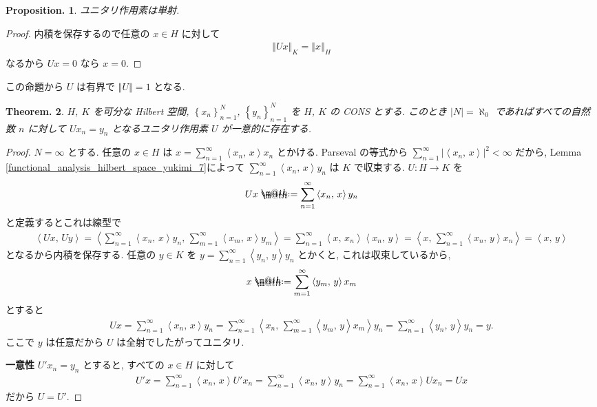 \documentclass[openany, a4paper, oneside]{jsbook}
\makeatletter
\newcommand*{\defeq}{\mathrel{\rlap{%
\raisebox{0.3ex}{$\m@th\cdot$}}%
\raisebox{-0.3ex}{$\m@th\cdot$}}%
=}
\theoremstyle{break}
\theoremstyle{breakdefn}
\newtheorem{thm}{Theorem.}[section]
\newtheorem{prop}[thm]{Proposition.}
\newcommand{\abs}[1]{\left|#1\right|}
\newcommand{\norm}[1]{\left\Vert#1\right\Vert}
\newcommand{\cbk}[1]{\left\{#1\right\}}
\newcommand{\bkt}[2]{\left\langle#1,\,#2\right\rangle}
\makeatother
\begin{document}
\begin{prop}
 ユニタリ作用素は単射.
\end{prop}
\begin{proof}
内積を保存するので任意の $x \in H$ に対して
\begin{align}
 \norm{Ux}_K
 =
 \norm{x}_H
\end{align}
なるから $Ux = 0$ なら $x = 0$.
\end{proof}
この命題から $U$ は有界で $\norm{U} = 1$ となる.

\begin{thm}\label{functional_analysis_hilbert_space_yukimi_12}
 $H$, $K$ を可分な Hilbert 空間, $\cbk{x_n}_{n=1}^N$, $\cbk{y_n}_{n=1}^N$ を $H$, $K$ の CONS とする.
 このとき $\abs{N} = \aleph_0$ であればすべての自然数 $n$ に対して $Ux_n = y_n$ となるユニタリ作用素 $U$ が一意的に存在する.
\end{thm}
\begin{proof}
$N = \infty$ とする.
任意の $x \in H$ は $x = \sum_{n=1}^\infty \bkt{x_n}{x} x_n$ とかける.
Parseval の等式から $\sum_{n=1}^\infty \abs{\bkt{x_n}{x}}^2 < \infty$ だから,
Lemma \ref{functional_analysis_hilbert_space_yukimi_7}によって $\sum_{n=1}^\infty \bkt{x_n}{x} y_n$ は $K$ で収束する.
$U \colon H \to K$ を
\begin{align}
 Ux
 \defeq
 \sum_{n=1}^\infty \bkt{x_n}{x} y_n
\end{align}
と定義するとこれは線型で
\begin{align}
 \bkt{Ux}{Uy}
 =
 \bkt{\sum_{n=1}^{\infty} \bkt{x_n}{x} y_n}{\sum_{m=1}^{\infty} \bkt{x_m}{x} y_m}
 =
 \sum_{n=1}^{\infty} \bkt{x}{x_n} \bkt{x_n}{y}
 =
 \bkt{x}{\sum_{n=1}^{\infty} \bkt{x_n}{y} x_n}
 =
 \bkt{x}{y}
\end{align}
となるから内積を保存する.
任意の $y \in K$ を $y = \sum_{n=1}^{\infty} \bkt{y_n}{y} y_n$ とかくと, これは収束しているから,
\begin{align}
 x
 \defeq
 \sum_{m=1}^{\infty} \bkt{y_m}{y} x_m
\end{align}
とすると
\begin{align}
 U x
 =
 \sum_{n=1}^{\infty} \bkt{x_n}{x} y_n
 =
 \sum_{n=1}^{\infty} \bkt{x_n}{\sum_{m=1}^{\infty} \bkt{y_m}{y} x_m} y_n
 =
 \sum_{n=1}^{\infty} \bkt{y_n}{y} y_n
 =
 y.
\end{align}
ここで $y$ は任意だから $U$ は全射でしたがってユニタリ.

\textbf{一意性}
$U'x_n = y_n$ とすると, すべての $x \in H$ に対して
\begin{align}
 U'x
 =
 \sum_{n=1}^{\infty} \bkt{x_n}{x} U' x_n
 =
 \sum_{n=1}^{\infty} \bkt{x_n}{y} y_n
 =
 \sum_{n=1}^{\infty} \bkt{x_n}{x} Ux_n
 =
 Ux
\end{align}
だから $U = U'$.
\end{proof}
\end{document}
